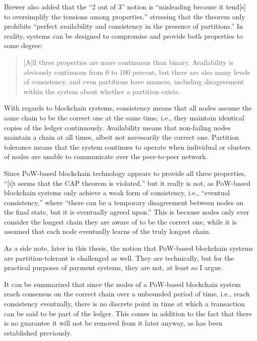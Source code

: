 Brewer also added that the ``2 out of 3'' notion is ``misleading because it tend[s] to oversimplify the tensions among properties,'' stressing that the theorem only prohibits ``perfect availability and consistency in the presence of partitions.'' \autocite{infoq2012caplater}
In reality, systems can be designed to compromise and provide both properties to some degree: \autocite{infoq2012caplater}

\begin{quote}
  [A]ll three properties are more continuous than binary. Availability is obviously continuous from 0 to 100 percent, but there are also many levels of consistency, and even partitions have nuances, including disagreement within the system about whether a partition exists.
\end{quote}

With regards to blockchain systems, consistency means that all nodes assume the same chain to be the correct one at the same time, i.e., they maintain identical copies of the ledger continuously.
Availability means that non-failing nodes maintain a chain at all times, albeit not necessarily the correct one.
Partition tolerance means that the system continues to operate when individual or clusters of nodes are unable to communicate over the peer-to-peer network.

Since PoW-based blockchain technology appears to provide all three properties, ``[i]t seems that the CAP theorem is violated,'' but it really is not, as PoW-based blockchain systems only achieve a weak form of consistency, i.e., ``eventual consistency,'' where ``there can be a temporary disagreement between nodes on the final state, but it is eventually agreed upon.'' \autocite{bashir2020}
This is because nodes only ever consider the longest chain they are aware of to be the correct one, while it is assumed that each node eventually learns of the truly longest chain.

As a side note, later in this thesis, the notion that PoW-based blockchain systems are partition-tolerant is challenged as well.
They are technically, but for the practical purposes of payment systems, they are not, at least so I argue.

It can be summarized that since the nodes of a PoW-based blockchain system reach consensus on the correct chain over a unbounded period of time, i.e., reach consistency eventually, there is no discrete point in time at which a transaction can be said to be part of the ledger.
This comes in addition to the fact that there is no guarantee it will not be removed from it later anyway, as has been established previously.

